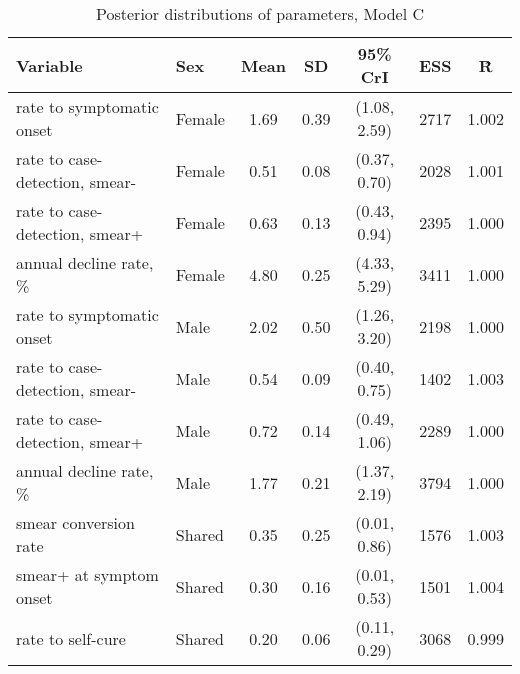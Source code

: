 \begin{table}[h]

\caption{\label{tab:}Posterior distributions of parameters, Model C}
\centering
\begin{tabular}[t]{llccccc}
\toprule
Variable & Sex & Mean & SD & 95\% CrI & ESS & \^{R}\\
\midrule
rate to symptomatic onset & Female & 1.69 & 0.39 & (1.08, 2.59) & 2717 & 1.002\\
rate to case-detection, smear- & Female & 0.51 & 0.08 & (0.37, 0.70) & 2028 & 1.001\\
rate to case-detection, smear+ & Female & 0.63 & 0.13 & (0.43, 0.94) & 2395 & 1.000\\
annual decline rate, \% & Female & 4.80 & 0.25 & (4.33, 5.29) & 3411 & 1.000\\
\addlinespace
rate to symptomatic onset & Male & 2.02 & 0.50 & (1.26, 3.20) & 2198 & 1.000\\
rate to case-detection, smear- & Male & 0.54 & 0.09 & (0.40, 0.75) & 1402 & 1.003\\
rate to case-detection, smear+ & Male & 0.72 & 0.14 & (0.49, 1.06) & 2289 & 1.000\\
annual decline rate, \% & Male & 1.77 & 0.21 & (1.37, 2.19) & 3794 & 1.000\\
\addlinespace
smear conversion rate & Shared & 0.35 & 0.25 & (0.01, 0.86) & 1576 & 1.003\\
smear+ at symptom onset & Shared & 0.30 & 0.16 & (0.01, 0.53) & 1501 & 1.004\\
rate to self-cure & Shared & 0.20 & 0.06 & (0.11, 0.29) & 3068 & 0.999\\
\bottomrule
\end{tabular}
\end{table}
